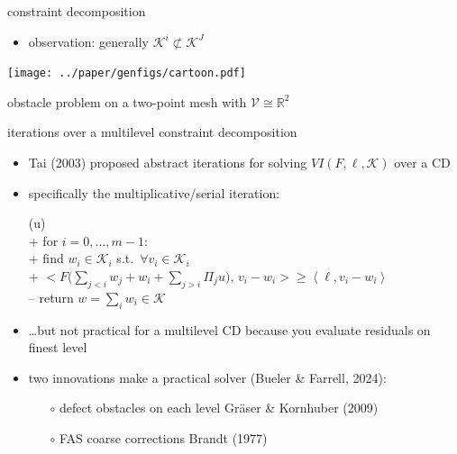 \documentclass[svgnames,
               hyperref={colorlinks,citecolor=DeepPink4,linkcolor=FireBrick,urlcolor=Maroon},
               usepdftitle=false]  %
               {beamer}
\newcommand{\RR}{\mathbb{R}}
\newcommand{\cK}{\mathcal{K}}
\newcommand{\ip}[2]{\left<#1,#2\right>}
\begin{document}
\begin{frame}{constraint decomposition}

\begin{itemize}
\item observation: generally $\mathcal{K}^i \not\subset \mathcal{K}^J$
\end{itemize}

\bigskip
\begin{center}
\texttt{[image: ../paper/genfigs/cartoon.pdf]}

\medskip
{\small obstacle problem on a two-point mesh with $\mathcal{V} \cong \RR^2$}
\end{center}
\end{frame}


\begin{frame}{iterations over a multilevel constraint decomposition}

\begin{itemize}
\item Tai (2003) proposed abstract iterations for solving $VI(F,\ell,\mathcal{K})$ over a CD
\item specifically the multiplicative/serial iteration:
\begin{pseudo}[left-margin=-3mm,font=\small]
(u)\text{:} \\+
    for $i = 0,\dots,m-1$: \\+
        find $w_i\in \cK_i$ s.t.~$\forall v_i \in \cK_i$ \\+
            $\displaystyle \Big<F\Big(\sum_{j<i} w_j + w_i + \sum_{j>i} \Pi_j u\Big),\, v_i - w_i\Big> \ge \ip{\ell}{v_i - w_i}$ \\--
    return $w=\sum_i w_i\in\cK$
\end{pseudo}

\item \dots but not practical for a multilevel CD because you evaluate residuals on finest level
\item two innovations make a practical solver (Bueler \& Farrell, 2024):

    \begin{itemize}
    \item[$\circ$] defect obstacles on each level  \hfill {\scriptsize Gr\"aser \& Kornhuber (2009)}
    \item[$\circ$] FAS coarse corrections  \hfill {\scriptsize Brandt (1977)}
    \end{itemize}
\end{itemize}
\end{frame}
\end{document}
